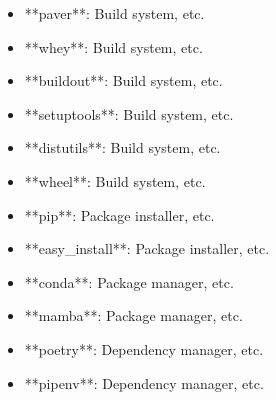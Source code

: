 \documentclass[11pt,a4paper]{article}
\begin{document}
\begin{itemize}
\item **paver**: Build system, etc.
\end{itemize}

\begin{itemize}
\item **whey**: Build system, etc.
\end{itemize}

\begin{itemize}
\item **buildout**: Build system, etc.
\end{itemize}

\begin{itemize}
\item **setuptools**: Build system, etc.
\end{itemize}

\begin{itemize}
\item **distutils**: Build system, etc.
\end{itemize}

\begin{itemize}
\item **wheel**: Build system, etc.
\end{itemize}

\begin{itemize}
\item **pip**: Package installer, etc.
\end{itemize}

\begin{itemize}
\item **easy_install**: Package installer, etc.
\end{itemize}

\begin{itemize}
\item **conda**: Package manager, etc.
\end{itemize}

\begin{itemize}
\item **mamba**: Package manager, etc.
\end{itemize}

\begin{itemize}
\item **poetry**: Dependency manager, etc.
\end{itemize}

\begin{itemize}
\item **pipenv**: Dependency manager, etc.
\end{itemize}
\end{document}
